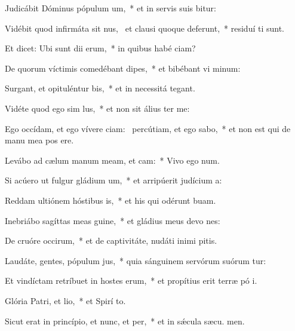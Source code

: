 \item Judicábit Dóminus pópulum um,~* et in servis suis bitur:
\item Vidébit quod infirmáta sit nus,~\pscross{} et clausi quoque deferunt,~* residuí ti sunt.
\item Et dicet: Ubi sunt dii erum,~* in quibus habé ciam?
\item De quorum víctimis comedébant dipes,~* et bibébant vi minum:
\item Surgant, et opituléntur bis,~* et in necessitá  tegant.
\item Vidéte quod ego sim lus,~* et non sit álius  ter me:
\item Ego occídam, et ego vívere ciam:~\pscross{} percútiam, et ego sabo,~* et non est qui de manu mea pos ere.
\item Levábo ad cælum manum meam, et cam:~* Vivo ego  num.
\item Si acúero ut fulgur gládium um,~* et arripúerit judícium  a:
\item Reddam ultiónem hóstibus is,~* et his qui odérunt  buam.
\item Inebriábo sagíttas meas guine,~* et gládius meus devo nes:
\item De cruóre occirum,~* et de captivitáte, nudáti inimi pitis.
\item Laudáte, gentes, pópulum jus,~* quia sánguinem servórum suórum tur:
\item Et vindíctam retríbuet in hostes erum,~* et propítius erit terræ pó i.
\item \singlecolsep
\item Glória Patri, et lio,~* et Spirí to.
\item Sicut erat in princípio, et nunc, et per,~* et in sǽcula sæcu. men.

